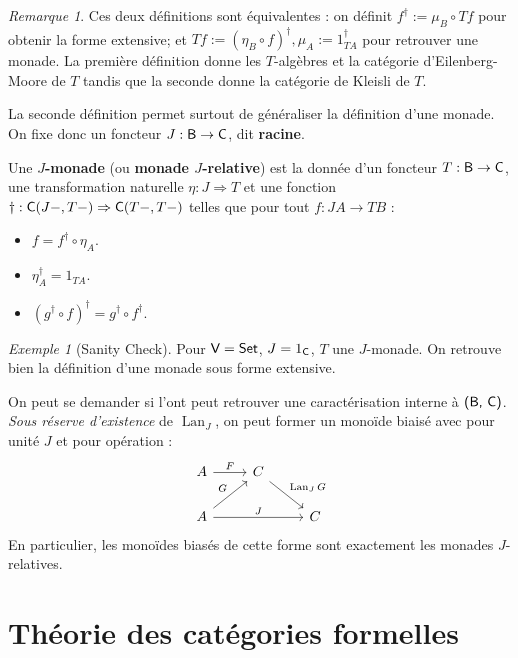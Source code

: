 \documentclass[8pt,a4paper,french,draft]{article}
\newcommand{\cat}[1]{\textcat{#1}}
\newcommand{\textcat}[1]{{\normalfont\textsf{#1}}}
\newcommand{\To}{\Rightarrow}
\DeclareMathOperator{\Lan}{Lan}
\theoremstyle{plain}
\theoremstyle{definition}
\theoremstyle{remark}
\newtheorem{remark}[theorem]{Remarque}
\newtheorem{example}[theorem]{Exemple}
\begin{document}
\begin{remark}
    Ces deux définitions sont équivalentes : on définit $f^\dagger := \mu_B \circ Tf$ pour obtenir la forme extensive; et $Tf := (\eta_B \circ f)^\dagger, \mu_A := 1_{TA}^\dagger$ pour retrouver une monade. La première définition donne les $T$-algèbres et la catégorie d'Eilenberg-Moore de $T$ tandis que la seconde donne la catégorie de Kleisli de $T$.
\end{remark}

La seconde définition permet surtout de généraliser la définition d'une monade. On fixe donc un foncteur $J : \cat{B} \to \cat{C}$, dit \textbf{racine}.

\begin{definition}
    Une \textbf{$J$-monade} (ou \textbf{monade $J$-relative}) est la donnée d'un foncteur $T : \cat{B} \to \cat{C}$, une transformation naturelle $\eta : J \To T$ et une fonction $\dagger : \cat{C}(J-, T-) \To \cat{C}(T-, T-)$ telles que pour tout $f : JA \to TB$ :
    \begin{itemize}
        \item $f = f^\dagger \circ \eta_A$.
        \item $\eta_A^\dagger = 1_{TA}$.
        \item $(g^\dagger \circ f)^\dagger = g^\dagger \circ f^\dagger$.
    \end{itemize}
\end{definition}

\begin{example}[Sanity Check]
    Pour $\cat{V} = \cat{Set}$, $J = 1_\cat{C}$, $T$ une $J$-monade. On retrouve bien la définition d'une monade sous forme extensive.
\end{example}

On peut se demander si l'ont peut retrouver une caractérisation interne à $\cat{(B, C)}$. \textit{Sous réserve d'existence} de $\Lan_J$, on peut former un monoïde biaisé avec pour unité $J$ et pour opération :
\[
    \begin{tikzcd}
        A \ar[r, "F"] & C \ar[rd, "\Lan_J G"]\\
        A \ar[ru, "G"] \ar[rr, "J"] && C
    \end{tikzcd}
\]
En particulier, les monoïdes biasés de cette forme sont exactement les monades $J$-relatives.


\section{Théorie des catégories formelles}
\end{document}
